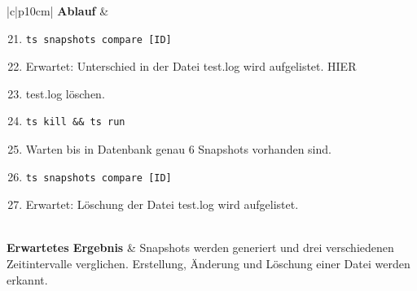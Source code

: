 \documentclass[a4paper,12pt]{report}
\begin{document}
    \begin{table}[h!]
        \centering
        \setlength{\leftmargini}{0.8cm}
        \begin{tabular}{|c|p{10cm}|}
            \hline
            \textbf{Ablauf} &
            \begin{enumerate}
                \setcounter{enumi}{20}
                \item \begin{verbatim}ts snapshots compare [ID]
                \end{verbatim}
                \item Erwartet: Unterschied in der Datei test.log wird aufgelistet.
                HIER
                \item test.log löschen.
                \item \begin{verbatim}ts kill && ts run
                \end{verbatim}
                \item Warten bis in Datenbank genau 6 Snapshots vorhanden sind.
                \item \begin{verbatim}ts snapshots compare [ID]
                \end{verbatim}
                \item Erwartet: Löschung der Datei test.log wird aufgelistet.
            \end{enumerate} \\ \hline
            \textbf{Erwartetes Ergebnis} & Snapshots werden generiert und drei verschiedenen Zeitintervalle verglichen.
            Erstellung, Änderung und Löschung einer Datei werden erkannt. \\ \hline
        \end{tabular}
        \caption{Manueller End-2-End Test E2E-007}\label{tab:e2e-7.2}
    \end{table}

    \clearpage
\end{document}
